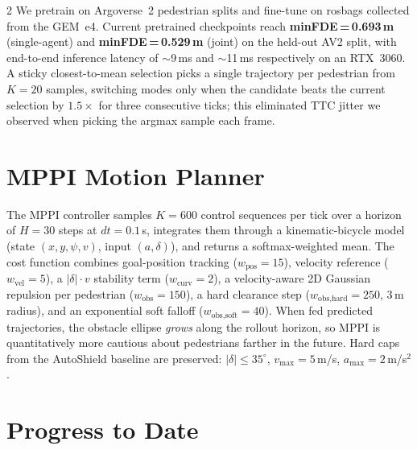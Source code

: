 \documentclass[10pt,letterpaper]{article}
\begin{document}
\begin{multicols}{2}
We pretrain on Argoverse~2 pedestrian splits and fine-tune on rosbags
collected from the GEM~e4.  Current pretrained checkpoints reach
\textbf{minFDE\,=\,0.693\,m} (single-agent) and \textbf{minFDE\,=\,0.529\,m}
(joint) on the held-out AV2 split, with end-to-end inference latency of
$\sim$9\,ms and $\sim$11\,ms respectively on an RTX~3060.  A
sticky closest-to-mean selection picks a single trajectory per
pedestrian from $K{=}20$ samples, switching modes only when the
candidate beats the current selection by $1.5{\times}$ for three
consecutive ticks; this eliminated TTC jitter we observed when picking
the argmax sample each frame.

\section{MPPI Motion Planner}

The MPPI controller samples $K{=}600$ control sequences per tick over a
horizon of $H{=}30$ steps at $dt{=}0.1$\,s, integrates them through a
kinematic-bicycle model (state $(x,y,\psi,v)$, input $(a,\delta)$), and
returns a softmax-weighted mean.  The cost function combines
goal-position tracking ($w_{\text{pos}}{=}15$), velocity reference
($w_{\text{vel}}{=}5$), a $|\delta|\cdot v$ stability term
($w_{\text{curv}}{=}2$), a velocity-aware 2D Gaussian repulsion per
pedestrian ($w_{\text{obs}}{=}150$), a hard clearance step
($w_{\text{obs,hard}}{=}250$, 3\,m radius), and an exponential soft
falloff ($w_{\text{obs,soft}}{=}40$).  When fed predicted trajectories,
the obstacle ellipse \emph{grows} along the rollout horizon, so MPPI is
quantitatively more cautious about pedestrians farther in the future.
Hard caps from the AutoShield baseline are preserved: $|\delta|{\le}35^{\circ}$,
$v_{\max}{=}5$\,m/s, $a_{\max}{=}2$\,m/s$^2$.

\section{Progress to Date}


\end{multicols}
\end{document}
